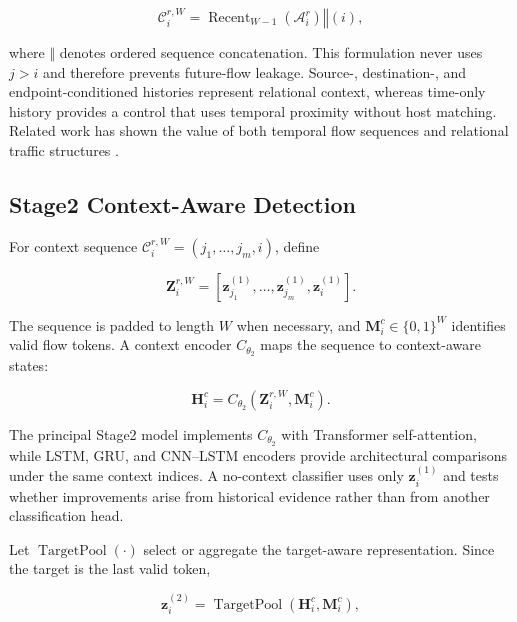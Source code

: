 \begin{equation}
\mathcal{C}_{i}^{r,W}
=
\operatorname{Recent}_{W-1}(\mathcal{A}_{i}^{r})
\mathbin{\Vert}
(i),
\label{eq:context_window}
\end{equation}

where $\Vert$ denotes ordered sequence concatenation. This formulation never
uses $j>i$ and therefore prevents future-flow leakage. Source-, destination-,
and endpoint-conditioned histories represent relational context, whereas
time-only history provides a control that uses temporal proximity without host
matching. Related work has shown the value of both temporal flow sequences and
relational traffic structures
\cite{Deng2023FlowTopology,MartinReizabal2026FlowWindow}.

\subsection{Stage2 Context-Aware Detection}
\label{subsec:pf_stage2}

For context sequence $\mathcal{C}_{i}^{r,W}=(j_1,\ldots,j_m,i)$, define

\begin{equation}
\mathbf{Z}_{i}^{r,W}
=
\left[
\mathbf{z}_{j_1}^{(1)},
\ldots,
\mathbf{z}_{j_m}^{(1)},
\mathbf{z}_{i}^{(1)}
\right].
\label{eq:stage2_input}
\end{equation}

The sequence is padded to length $W$ when necessary, and
$\mathbf{M}_{i}^{c}\in\{0,1\}^{W}$ identifies valid flow tokens. A context
encoder $C_{\theta_2}$ maps the sequence to context-aware states:

\begin{equation}
\mathbf{H}_{i}^{c}
=
C_{\theta_2}
\left(
\mathbf{Z}_{i}^{r,W},
\mathbf{M}_{i}^{c}
\right).
\label{eq:stage2_encoder}
\end{equation}

The principal Stage2 model implements $C_{\theta_2}$ with Transformer
self-attention, while LSTM, GRU, and CNN--LSTM encoders provide architectural
comparisons under the same context indices. A no-context classifier uses only
$\mathbf{z}_{i}^{(1)}$ and tests whether improvements arise from historical
evidence rather than from another classification head.

Let $\operatorname{TargetPool}(\cdot)$ select or aggregate the target-aware
representation. Since the target is the last valid token,

\begin{equation}
\mathbf{z}_{i}^{(2)}
=
\operatorname{TargetPool}
\left(
\mathbf{H}_{i}^{c},\mathbf{M}_{i}^{c}
\right),
\label{eq:stage2_embedding}
\end{equation}

